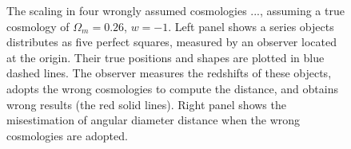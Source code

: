 \documentclass[iop]{emulateapj}
\begin{document}
\begin{figure}
   \caption{\label{fig_xyquan}
   The scaling in four wrongly assumed cosmologies ..., %
   assuming a true cosmology of $\Omega_m=0.26$, $w=-1$.
   Left panel shows a series objects distributes as five perfect squares, measured by an observer located at the origin.
   Their true positions and shapes are plotted in blue dashed lines.
   The observer measures the redshifts of these objects, adopts the wrong cosmologies to compute the distance,
   and obtains wrong results (the red solid lines).
   Right panel shows the misestimation of angular diameter distance when the wrong cosmologies are adopted.
   }
\end{figure}
\end{document}

